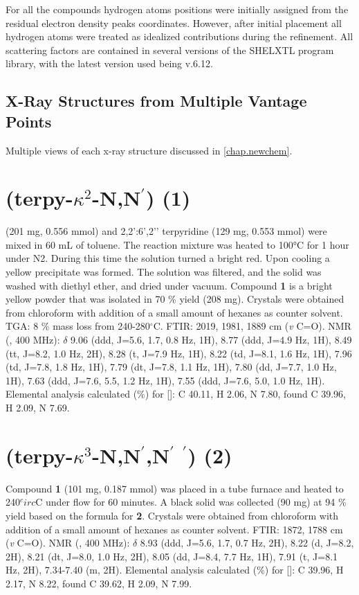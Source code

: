 For all the compounds hydrogen atoms positions were initially assigned from the residual electron density peaks coordinates. However, after initial placement all hydrogen atoms were treated as idealized contributions during the refinement. All scattering factors are contained in several versions of the SHELXTL program library, with the latest version used being v.6.12\autocite{sheldrick2008}.

\subsection{X-Ray Structures from Multiple Vantage Points} \label{ssec.views}
Multiple views of each x-ray structure discussed in \autoref{chap.newchem}.


\section{(terpy-$\kappa^2$-N,N$^\prime$) (1)} \label{sec.c1}
 (201 mg,  0.556 mmol) and 2,2’:6’,2’’ terpyridine (129 mg, 0.553 mmol) were mixed in 60 mL of toluene. The reaction mixture was heated to 100°C for 1 hour under N2. During this time the solution turned a bright red. Upon cooling a yellow precipitate was formed. The solution was filtered, and the solid was washed with diethyl ether, and dried under vacuum. Compound \textbf{1} is a bright yellow powder that was isolated in 70 \% yield (208 mg). Crystals were obtained from chloroform with addition of a small amount of hexanes as counter solvent. TGA: 8 \% mass loss from 240-280$^\circ$C.  FTIR: 2019, 1981, 1889 cm (\textit{v} C=O).  NMR (, 400 MHz): $\delta$ 9.06 (ddd, J=5.6, 1.7, 0.8 Hz, 1H), 8.77 (ddd, J=4.9 Hz, 1H), 8.49 (tt, J=8.2, 1.0 Hz, 2H), 8.28 (t, J=7.9 Hz, 1H), 8.22 (td, J=8.1, 1.6 Hz, 1H), 7.96 (td, J=7.8, 1.8 Hz, 1H), 7.79 (dt, J=7.8, 1.1 Hz, 1H), 7.80 (dd, J=7.7, 1.0 Hz, 1H), 7.63 (ddd, J=7.6, 5.5, 1.2 Hz, 1H), 7.55 (ddd, J=7.6, 5.0, 1.0 Hz, 1H). Elemental analysis calculated (\%) for []: C 40.11, H 2.06, N 7.80, found C 39.96, H 2.09, N 7.69.

\section{(terpy-$\kappa^3$-N,N$^\prime$,N$^\prime$ $^\prime$) (2)} \label{sec.c2}
Compound \textbf{1} (101 mg, 0.187 mmol) was placed in a tube furnace and heated to 240$^circ$C under  flow for 60 minutes. A black solid was collected (90 mg) at 94 \% yield based on the formula for \textbf{2}. Crystals were obtained from chloroform with addition of a small amount of hexanes as counter solvent. FTIR: 1872, 1788 cm (\textit{v} C=O).  NMR (, 400 MHz): $\delta$ 8.93 (ddd, J=5.6, 1.7, 0.7 Hz, 2H), 8.22 (d, J=8.2, 2H), 8.21 (dt, J=8.0, 1.0 Hz, 2H), 8.05 (dd, J=8.4, 7.7 Hz, 1H), 7.91 (t, J=8.1 Hz, 2H), 7.34-7.40 (m, 2H). Elemental analysis calculated (\%) for []: C 39.96, H 2.17, N 8.22, found C 39.62, H 2.09, N 7.99.

